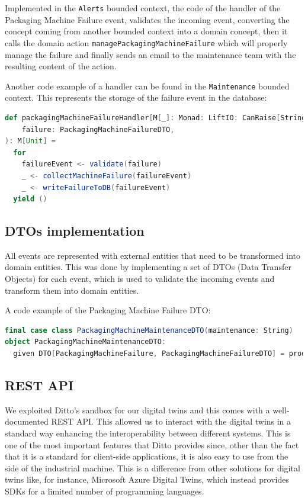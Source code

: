 Implemented in the \texttt{Alerts} bounded context, the code of the handler of the Packaging Machine Failure event, validates the incoming event, converting the concept coming from another bounded context into a domain concept, then it calls the domain action \texttt{managePackagingMachineFailure} which will properly manage the failure and finally sends an email to the maintenance team with the resulting content of the action.

Another code example of a handler can be found in the \texttt{Maintenance} bounded context.
This represents the storage of the failure event in the database:

\begin{lstlisting}[language=Scala]
def packagingMachineFailureHandler[M[_]: Monad: LiftIO: CanRaise[String]](
    failure: PackagingMachineFailureDTO,
): M[Unit] =
  for
    failureEvent <- validate(failure)
    _ <- collectMachineFailure(failureEvent)
    _ <- writeFailureToDB(failureEvent)
  yield ()
\end{lstlisting}

\subsection{DTOs implementation}
All events are represented with external entities that need to be transformed into domain entities.
This was done by implementing a set of DTOs (Data Transfer Objects) for each event, which is used to validate the incoming events and transform them into domain entities.

A code example of the Packaging Machine Failure DTO:

\begin{lstlisting}[language=Scala]
final case class PackagingMachineMaintenanceDTO(maintenance: String)
object PackagingMachineMaintenanceDTO:
  given DTO[PackagingMachineFailure, PackagingMachineFailureDTO] = productTypeDTO

\end{lstlisting}

\subsection{REST API}
We exploited Ditto's sandbox for our digital twins and this comes with a well-documented REST API.
This allowed us to interact with the digital twins in a standard way enhancing the interoperability between different systems.
This is one of the most important features that Ditto provides since, other than the fact that it is a standard for client-side applications, it is also easy to use from the side of the industrial machine.
This is a difference from other solutions for digital twins like, for instance, Microsoft Azure Digital Twins, which instead provides SDKs for a limited number of programming languages.
